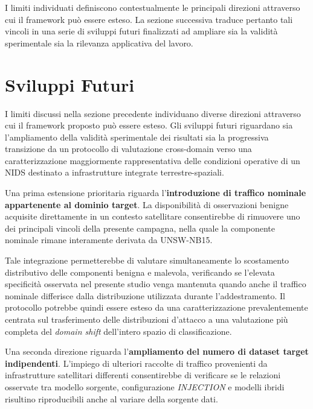 I limiti individuati definiscono contestualmente le principali direzioni attraverso cui il framework può essere esteso.
La sezione successiva traduce pertanto tali vincoli in una serie di sviluppi futuri finalizzati ad ampliare sia la validità sperimentale sia la rilevanza applicativa del lavoro.




\section{Sviluppi Futuri}
\label{sec:sviluppi_futuri}

I limiti discussi nella sezione precedente individuano diverse direzioni attraverso cui il framework proposto può essere esteso.
Gli sviluppi futuri riguardano sia l'ampliamento della validità sperimentale dei risultati sia la progressiva transizione da un protocollo di valutazione cross-domain verso una caratterizzazione maggiormente rappresentativa delle condizioni operative di un NIDS destinato a infrastrutture integrate terrestre-spaziali.

Una prima estensione prioritaria riguarda l'\textbf{introduzione di traffico nominale appartenente al dominio target}.
La disponibilità di osservazioni benigne acquisite direttamente in un contesto satellitare consentirebbe di rimuovere uno dei principali vincoli della presente campagna, nella quale la componente nominale rimane interamente derivata da UNSW-NB15.

Tale integrazione permetterebbe di valutare simultaneamente lo scostamento distributivo delle componenti benigna e malevola, verificando se l'elevata specificità osservata nel presente studio venga mantenuta quando anche il traffico nominale differisce dalla distribuzione utilizzata durante l'addestramento.
Il protocollo potrebbe quindi essere esteso da una caratterizzazione prevalentemente centrata sul trasferimento delle distribuzioni d'attacco a una valutazione più completa del \textit{domain shift} dell'intero spazio di classificazione.

Una seconda direzione riguarda l'\textbf{ampliamento del numero di dataset target indipendenti}.
L'impiego di ulteriori raccolte di traffico provenienti da infrastrutture satellitari differenti consentirebbe di verificare se le relazioni osservate tra modello sorgente, configurazione \textit{INJECTION} e modelli ibridi risultino riproducibili anche al variare della sorgente dati.

